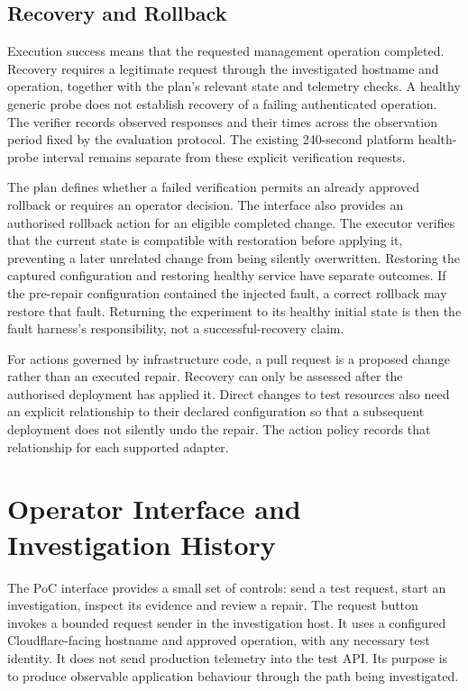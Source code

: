 \subsection{Recovery and Rollback}

Execution success means that the requested management operation completed.
Recovery requires a legitimate request through the investigated hostname
and operation, together with the plan's relevant state and telemetry
checks. A healthy generic probe does not establish recovery of a failing
authenticated operation. The verifier records observed responses and
their times across the observation period fixed by the evaluation
protocol. The existing 240-second platform health-probe interval remains
separate from these explicit verification requests.

The plan defines whether a failed verification permits an already approved
rollback or requires an operator decision. The interface also provides
an authorised rollback action for an eligible completed change. The
executor verifies that the current state is compatible with restoration
before applying it, preventing a later unrelated change from being
silently overwritten. Restoring the captured configuration and restoring
healthy service have separate outcomes. If the pre-repair configuration
contained the injected fault, a correct rollback may restore that fault.
Returning the experiment to its healthy initial state is then the fault
harness's responsibility, not a successful-recovery claim.

For actions governed by infrastructure code, a pull request is a proposed
change rather than an executed repair. Recovery can only be assessed
after the authorised deployment has applied it. Direct changes to test
resources also need an explicit relationship to their declared
configuration so that a subsequent deployment does not silently undo the
repair. The action policy records that relationship for each supported
adapter.

\section{Operator Interface and Investigation History}
\label{sec:design:interface}

The PoC interface provides a small set of controls: send a test request,
start an investigation, inspect its evidence and review a repair. The
request button invokes a bounded request sender in the investigation host.
It uses a configured Cloudflare-facing hostname and approved operation,
with any necessary test identity. It does not send production telemetry
into the test API. Its purpose is to produce observable application
behaviour through the path being investigated.

